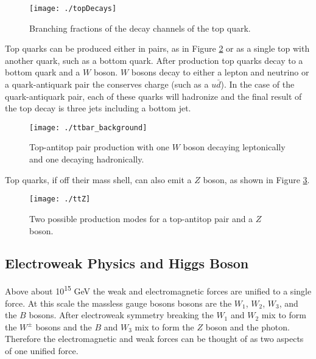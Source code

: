 \begin{figure}[h!]
  \centering
	\texttt{[image: ./topDecays]}
\caption{\label{fig:dmMake}{Branching fractions of the decay channels of the top quark\cite{topquarkdecaysPieChart}.}} 
\end{figure}


Top quarks can be produced either in pairs, as in Figure \ref{fig:ttbarfeynman} or as a single top with another quark, such as a bottom quark.  After production top quarks decay to a bottom quark and a $W$ boson.  $W$ bosons decay to either a lepton and neutrino or a quark-antiquark pair the conserves charge (such as a $u\bar{d}$).  In the case of the quark-antiquark pair, each of these quarks will hadronize and the final result of the top decay is three jets including a bottom jet.  \\

\begin{figure}[h!]
  \centering
	\texttt{[image: ./ttbar\_background]}
\caption{\label{fig:ttbarfeynman}{ Top-antitop pair production with one $W$ boson decaying leptonically and one decaying hadronically. }} 
\end{figure}

Top quarks, if off their mass shell, can also emit a $Z$ boson, as shown in Figure \ref{fig:ttz}. \\

\begin{figure}[h!]
  \centering
	\texttt{[image: ./ttZ]}
\caption{\label{fig:ttz}{ Two possible production modes for a top-antitop pair and a $Z$ boson. }} 
\end{figure}
	
	

\subsection{Electroweak Physics and Higgs Boson} %

	Above about 10\textsuperscript{15} GeV the weak and electromagnetic forces are unified to a single force.  At this scale the massless gauge bosons bosons are the $W_{1}$, $W_{2}$, $W_{3}$, and the $B$ bosons.  After electroweak symmetry breaking the $W_{1}$ and $W_{2}$ mix to form the $W^{\pm}$ bosons and the $B$ and $W_{3}$ mix to form the $Z$ boson and the photon.  Therefore the electromagnetic and weak forces can be thought of as two aspects of one unified force.  \\
	

